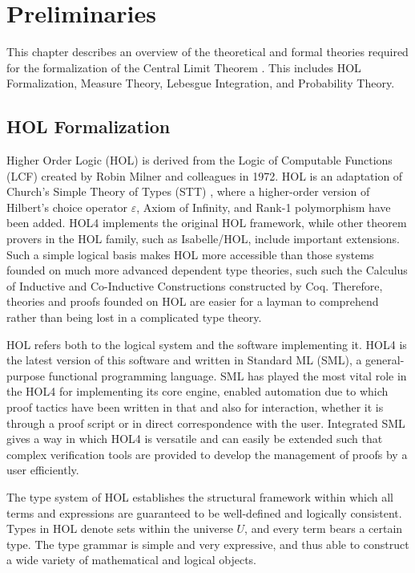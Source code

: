 \chapter[Preliminaries]{Preliminaries}
\label{chap:3}

This chapter describes an overview of the theoretical and formal theories required for the formalization of the Central Limit Theorem . This includes HOL Formalization, Measure Theory, Lebesgue Integration, and Probability Theory.
\section{HOL Formalization}
Higher Order Logic (HOL) \cite{hol4, slind2008brief} is derived from the Logic of Computable Functions (LCF) \cite{gordon1979edinburgh, milner1972logic} created by Robin Milner and colleagues in 1972. HOL is an adaptation of Church's Simple Theory of Types (STT) \cite{church1940formulation}, where a higher-order version of Hilbert's choice operator $\varepsilon $, Axiom of Infinity, and Rank-1 polymorphism have been added. HOL4 implements the original HOL framework, while other theorem provers in the HOL family, such as Isabelle/HOL, include important extensions. Such a simple logical basis makes HOL more accessible than those systems founded on much more advanced dependent type theories, such such the Calculus of Inductive and Co-Inductive Constructions constructed by Coq. Therefore, theories and proofs founded on HOL are easier for a layman to comprehend rather than being lost in a complicated type theory.

HOL refers both to the logical system and the software implementing it. HOL4 is the latest version of this software and written in Standard ML (SML), a general-purpose functional programming language.  SML has played the most vital role in the HOL4 for implementing its core engine, enabled automation due to which proof tactics have been written in that and also for interaction, whether it is through a proof script or in direct correspondence with the user. Integrated SML gives a way in which HOL4 is versatile and can easily be extended such that complex verification tools are provided to develop the management of proofs by a user efficiently.

The type system of HOL establishes the structural framework within which all terms and expressions are guaranteed to be well-defined and logically consistent. Types in HOL denote sets within the universe $ U $, and every term bears a certain type. The type grammar is simple and very expressive, and thus able to construct a wide variety of mathematical and logical objects.

